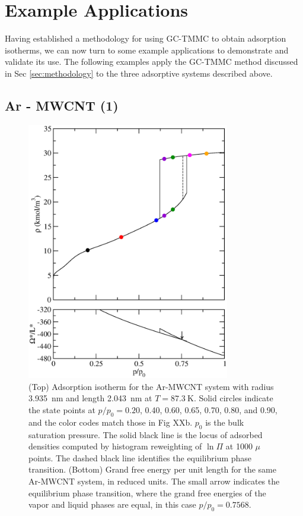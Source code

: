 \section{Example Applications} \label{sec:examples}

Having established a methodology for using GC-TMMC to obtain adsorption isotherms, we can now turn to some example applications to demonstrate and validate its use.  The following examples apply the GC-TMMC method discussed in Sec \ref{sec:methodology} to the three adsorptive systems described above.

\subsection{Ar - MWCNT (1)}

%
\begin{figure}
  \includegraphics[clip=true,width=0.79\textwidth]{Figures/r115575_reweight_isotherm_with_gpfe}
\caption{(Top) Adsorption isotherm for the Ar-MWCNT system with radius 3.935~nm and length 2.043~nm at $T=87.3~\text{K}$. Solid circles indicate the state points at $p/p_0 = 0.20$, 0.40, 0.60, 0.65, 0.70, 0.80, and 0.90, and the color codes match those in Fig XXb. $p_0$ is the bulk saturation pressure. The solid black line is the locus of adsorbed densities computed by histogram reweighting of $\ln \Pi$ at 1000 $\mu$ points. The dashed black line identifies the equilibrium phase transition. (Bottom) Grand free energy per unit length for the same Ar-MWCNT system, in reduced units. The small arrow indicates the equilibrium phase transition, where the grand free energies of the vapor and liquid phases are equal, in this case $p/p_0=0.7568$.}
  \label{cs1043_r11.5575_isotherm}
\end{figure}
